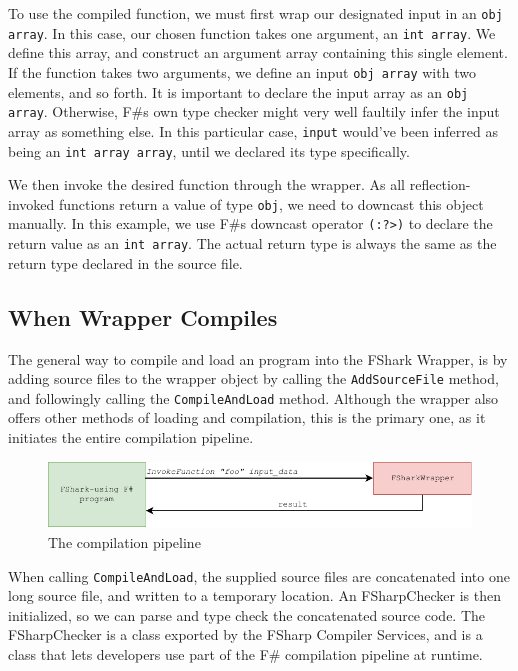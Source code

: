To use the compiled \fshark{} function, we must first wrap our designated input in
an \texttt{obj array}. In this case, our chosen \fshark{} function takes one
argument, an \texttt{int array}. We define this array, and construct an argument
array containing this single element. If the \fshark{} function takes two
arguments, we define an input \texttt{obj array} with two elements, and so
forth.
It is important to declare the input array as an \texttt{obj array}. Otherwise,
F\#s own type checker might very well faultily infer the input array as
something else. In this particular case, \texttt{input} would've been inferred
as being an \texttt{int array array}, until we declared its type specifically.

We then invoke the desired function through the wrapper. As all
reflection-invoked functions return a value of type \texttt{obj}, we need to
downcast this object manually.
In this example, we use F\#s downcast operator \texttt{(:?>)} to declare the
return value as an \texttt{int array}. The actual return type is always the same as the
return type declared in the source \fshark{} file.

\subsection*{When \fshark{} Wrapper Compiles}
\label{sec:fsharkwrappercompiles}
The general way to compile and load an \fshark{} program into the FShark Wrapper,
is by adding \fshark{} source files to the wrapper object by calling the
\texttt{AddSourceFile} method, and followingly calling the \texttt{CompileAndLoad}
method. Although the \fshark{} wrapper also offers other methods of loading and
compilation, this is the primary one, as it initiates the entire \fshark{}
compilation pipeline.

\begin{figure}[h]
  \centering
  \includegraphics{chapters/figs/csharp/pipeline_step_3.pdf}
  \caption{The \fshark{} compilation pipeline}
  \label{fig:fsharkcompilerpipeline}
\end{figure}


When calling \texttt{CompileAndLoad}, the supplied \fshark{} source files are
concatenated into one long source file, and written to a temporary location.
An FSharpChecker is then initialized, so we can parse and type check the
concatenated source code. The FSharpChecker is a class exported by the FSharp
Compiler Services, and is a class that lets developers use part of the F\#
compilation pipeline at runtime.

